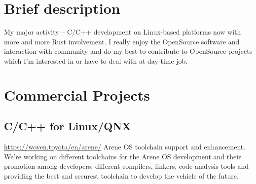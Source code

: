 \documentclass[11pt,a4paper]{moderncv}
\begin{document}
\maketitle

\section{Brief description}
\cvitem {} {My major activity -- C/C++ development on Linux-based platforms now
  with more and more Rust involvement.\newline{} I really enjoy the OpenSource
  software and interaction with community and do my best to contribute to
  OpenSource projects which I'm interested in or have to deal with at day-time
  job.}
\section{Commercial Projects}
  \subsection{C/C++ for Linux/QNX}
  {\url{https://woven.toyota/en/arene/}\newline{}
    Arene OS toolchain support and enhancement.\newline{}
    We're working on different toolchains for the Arene OS development and
    their promotion among developers: different compilers, linkers, code
    analysis tools and providing the best and securest toolchain to develop the
    vehicle of the future.}
\end{document}
